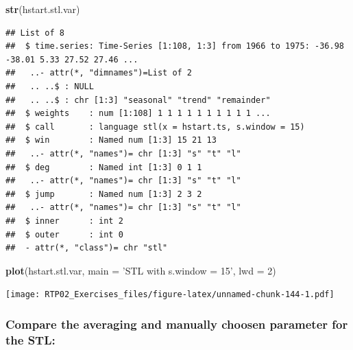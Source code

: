 \documentclass[
]{article}
\newenvironment{Shaded}{\begin{snugshade}}{\end{snugshade}}
\newcommand{\DataTypeTok}[1]{\textcolor[rgb]{0.13,0.29,0.53}{#1}}
\newcommand{\DecValTok}[1]{\textcolor[rgb]{0.00,0.00,0.81}{#1}}
\newcommand{\KeywordTok}[1]{\textcolor[rgb]{0.13,0.29,0.53}{\textbf{#1}}}
\newcommand{\NormalTok}[1]{#1}
\newcommand{\StringTok}[1]{\textcolor[rgb]{0.31,0.60,0.02}{#1}}
\begin{document}
\begin{Shaded}
\begin{Highlighting}[]
\KeywordTok{str}\NormalTok{(hstart.stl.var)}
\end{Highlighting}
\end{Shaded}

\begin{verbatim}
## List of 8
##  $ time.series: Time-Series [1:108, 1:3] from 1966 to 1975: -36.98 -38.01 5.33 27.52 27.46 ...
##   ..- attr(*, "dimnames")=List of 2
##   .. ..$ : NULL
##   .. ..$ : chr [1:3] "seasonal" "trend" "remainder"
##  $ weights    : num [1:108] 1 1 1 1 1 1 1 1 1 1 ...
##  $ call       : language stl(x = hstart.ts, s.window = 15)
##  $ win        : Named num [1:3] 15 21 13
##   ..- attr(*, "names")= chr [1:3] "s" "t" "l"
##  $ deg        : Named int [1:3] 0 1 1
##   ..- attr(*, "names")= chr [1:3] "s" "t" "l"
##  $ jump       : Named num [1:3] 2 3 2
##   ..- attr(*, "names")= chr [1:3] "s" "t" "l"
##  $ inner      : int 2
##  $ outer      : int 0
##  - attr(*, "class")= chr "stl"
\end{verbatim}

\begin{Shaded}
\begin{Highlighting}[]
\KeywordTok{plot}\NormalTok{(hstart.stl.var, }\DataTypeTok{main =} \StringTok{'STL with s.window = 15'}\NormalTok{, }\DataTypeTok{lwd =} \DecValTok{2}\NormalTok{)}
\end{Highlighting}
\end{Shaded}

\texttt{[image: RTP02\_Exercises\_files/figure-latex/unnamed-chunk-144-1.pdf]}

\hypertarget{compare-the-averaging-and-manually-choosen-parameter-for-the-stl}{%
\subsubsection{Compare the averaging and manually choosen parameter for
the
STL:}\label{compare-the-averaging-and-manually-choosen-parameter-for-the-stl}}
\end{document}
